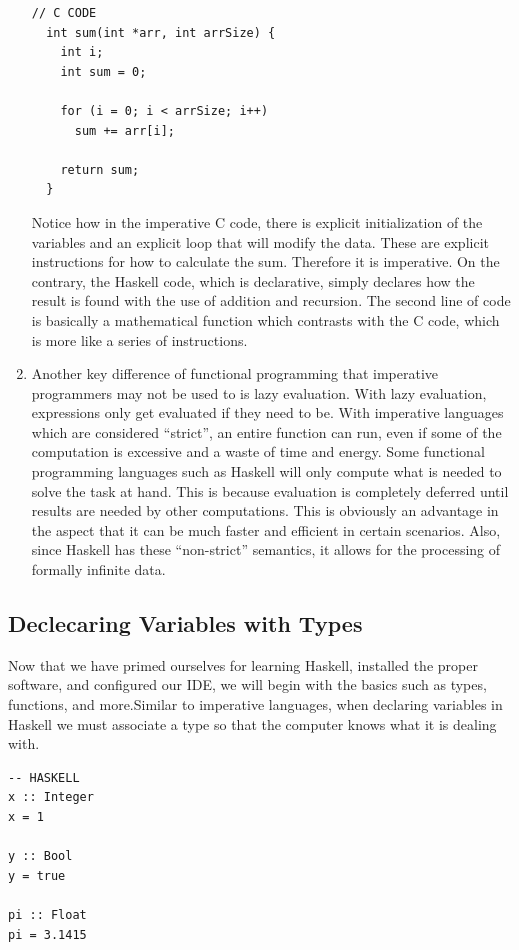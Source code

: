 \documentclass{article}
\begin{document}
\begin{enumerate}
  \begin{lstlisting}[style=CStyle]
  // C CODE
  int sum(int *arr, int arrSize) {
    int i;
    int sum = 0;
  
    for (i = 0; i < arrSize; i++)
      sum += arr[i];
  
    return sum;
  }
  \end{lstlisting}

  Notice how in the imperative C code, there is explicit initialization of the variables and an explicit loop that will modify the data. These are explicit instructions for how to calculate the sum. Therefore it is imperative. On the contrary, the Haskell code, which is declarative, simply declares how the result is found with the use of addition and recursion. The second line of code is basically a mathematical function which contrasts with the C code, which is more like a series of instructions.

  \item Another key difference of functional programming that imperative programmers may not be used to is lazy evaluation. With lazy evaluation, expressions only get evaluated if they need to be. With imperative languages which are considered “strict”, an entire function can run, even if some of the computation is excessive and a waste of time and energy. Some functional programming languages such as Haskell will only compute what is needed to solve the task at hand. This is because evaluation is completely deferred until results are needed by other computations. This is obviously an advantage in the aspect that it can be much faster and efficient in certain scenarios. Also, since Haskell has these “non-strict” semantics, it allows for the processing of formally infinite data. 
\end{enumerate}

\subsection{Declecaring Variables with Types}
\medskip\noindent
Now that we have primed ourselves for learning Haskell, installed the proper software, and configured our IDE, we will begin with the basics such as types, functions, and more.Similar to imperative languages, when declaring variables in Haskell we must associate a type so that the computer knows what it is dealing with. 

\begin{lstlisting}[style=HaskellStyle]
-- HASKELL
x :: Integer
x = 1

y :: Bool
y = true

pi :: Float
pi = 3.1415
\end{lstlisting}
\end{document}
